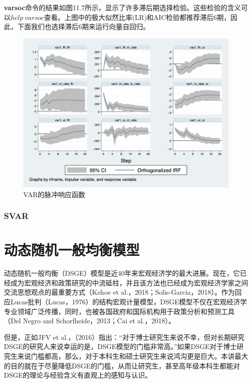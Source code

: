 \documentclass[cn,12pt,math=newtx,citestyle=gb7714-2015,bibstyle=gb7714-2015]{elegantbook}
\begin{document}
	\textbf{varsoc}命令的结果如图11.7所示，显示了许多滞后期选择检验。这些检验的含义可以$help~ varsoc$查看。上图中的极大似然比率(LR)和AIC检验都推荐滞后6期，因此，下面我们也选择滞后6期来运行向量自回归。
	
	
	
	\begin{figure}[tbph]
		\centering
		\includegraphics[width=1\linewidth]{var_irf}
		\caption{VAR的脉冲响应函数}
		\label{fig:var_irf}
	\end{figure}
	
	
	\subsection{SVAR}
	
	
	
	
	\chapter{动态随机一般均衡模型}
	
	动态随机一般均衡（DSGE）模型是近40年来宏观经济学的最大进展。现在，它已经成为宏观经济和政策研究的中流砥柱，并且该方法也已经成为宏观经济学家之间交流思想观点的最重要方式（Kehoe et al.，2018；Solis-Garcia，2018）。作为回应Lucas批判（Lucas，1976）的结构宏观计量模型，DSGE模型不仅在宏观经济学专业领域广泛传播，同时，也被各国政府和国际机构用于政策分析和预测工具（Del Negro and Schorfheide，2013；Cai et al.，2018）。
	
	但是，正如JFV et al.，（2016）指出：“对于博士研究生来说不幸，但对长期研究DSGE的研究人来说幸运的是，DSGE模型的门槛非常高。”如果DSGE对于博士研究生来说门槛都高，那么，对于本科生和硕士研究生来说鸿沟更是巨大。本讲最大的目的就在于尽量降低DSGE的门槛，从而让研究生，甚至高年级本科生都能对DSGE的理论与经验含义有直观上的感知与认识。
	
\end{document}
